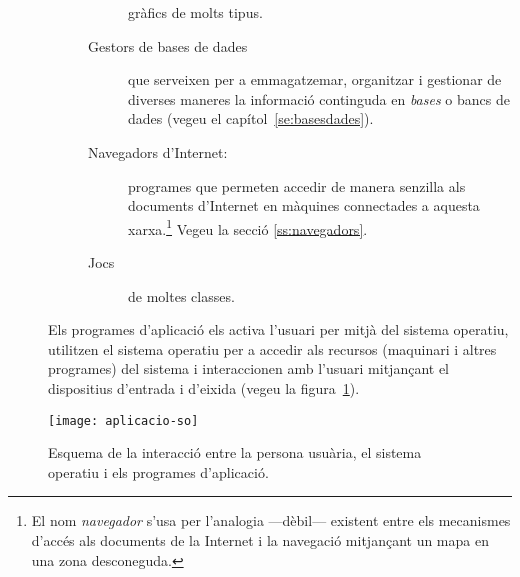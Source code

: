 \begin{description}
\begin{description}
\begin{description}
                  gràfics de molts tipus.
                \item[Gestors de bases de dades] \label{pg:BD} que
                  serveixen per a emmagatzemar, organitzar i gestionar
                  de diverses maneres la informació continguda en
                  \emph{bases} o bancs de dades (vegeu el
                  capítol~\ref{se:basesdades}).
                \item[Navegadors d'Internet:] programes que permeten
                  accedir de manera senzilla als documents d'Internet
                  en màquines connectades a aquesta xarxa.\footnote{El
                    nom \emph{navegador} s'usa per l'analogia
                    ---dèbil--- existent entre els mecanismes d'accés
                    als documents de la Internet i la navegació
                    mitjançant un mapa en una zona desconeguda.}
                  Vegeu la secció \ref{ss:navegadors}.
                \item[Jocs] de moltes classes.
                \end{description}
        \end{description}
        Els programes d'aplicació els activa l'usuari per mitjà del
        sistema operatiu, utilitzen el sistema operatiu per a accedir
        als recursos (maquinari i altres programes) del sistema i
        interaccionen amb l'usuari mitjançant el dispositius d'entrada
        i d'eixida (vegeu la figura~\ref{fg:aplicacio-so}).
\end{description}

\begin{figure}
  \centering
  \texttt{[image: aplicacio-so]}
  \caption{Esquema de la interacció entre la persona usuària, el
    sistema operatiu i els programes d'aplicació.}
  \label{fg:aplicacio-so}
\end{figure}

